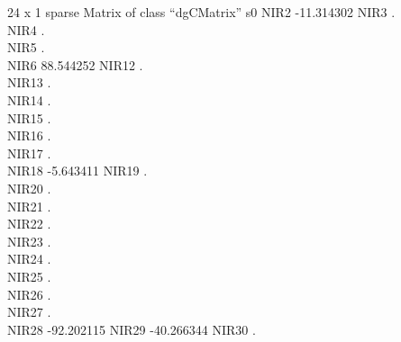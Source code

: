 \documentclass[
]{article}
\newenvironment{Shaded}{\begin{snugshade}}{\end{snugshade}}
\newcommand{\AttributeTok}[1]{\textcolor[rgb]{0.77,0.63,0.00}{#1}}
\newcommand{\DecValTok}[1]{\textcolor[rgb]{0.00,0.00,0.81}{#1}}
\newcommand{\FloatTok}[1]{\textcolor[rgb]{0.00,0.00,0.81}{#1}}
\newcommand{\FunctionTok}[1]{\textcolor[rgb]{0.00,0.00,0.00}{#1}}
\newcommand{\NormalTok}[1]{#1}
\newcommand{\OtherTok}[1]{\textcolor[rgb]{0.56,0.35,0.01}{#1}}
\newcommand{\SpecialCharTok}[1]{\textcolor[rgb]{0.00,0.00,0.00}{#1}}
\begin{document}
\begin{Shaded}
\end{Shaded}

24 x 1 sparse Matrix of class ``dgCMatrix'' s0 NIR2 -11.314302 NIR3 .\\
NIR4 .\\
NIR5 .\\
NIR6 88.544252 NIR12 .\\
NIR13 .\\
NIR14 .\\
NIR15 .\\
NIR16 .\\
NIR17 .\\
NIR18 -5.643411 NIR19 .\\
NIR20 .\\
NIR21 .\\
NIR22 .\\
NIR23 .\\
NIR24 .\\
NIR25 .\\
NIR26 .\\
NIR27 .\\
NIR28 -92.202115 NIR29 -40.266344 NIR30 .
\end{document}
